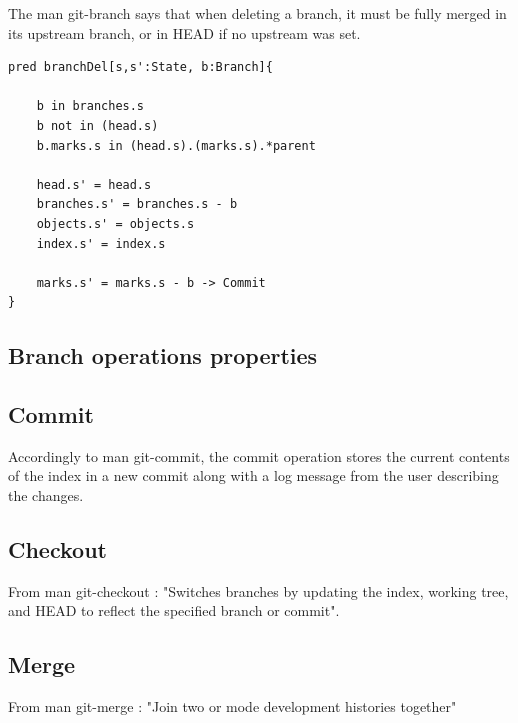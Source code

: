 The man git-branch says that when deleting a branch, it must be fully
merged in its upstream branch, or in HEAD if no upstream was set. \par

\begin{lstlisting}
pred branchDel[s,s':State, b:Branch]{
		
	b in branches.s
	b not in (head.s)
	b.marks.s in (head.s).(marks.s).*parent

	head.s' = head.s
	branches.s' = branches.s - b
	objects.s' = objects.s
	index.s' = index.s

	marks.s' = marks.s - b -> Commit
}
\end{lstlisting}


\subsection{Branch operations properties }

\subsection{Commit}

Accordingly to man git-commit, the commit operation 
stores the current contents of the index in a new commit 
along with a log message from the user describing the changes. \par 


\subsection{Checkout}

From man git-checkout : "Switches branches by updating the index, 
working tree, and HEAD to reflect the specified branch or commit". \par

\subsection{Merge}

From man git-merge : "Join two or mode development histories together" \par


